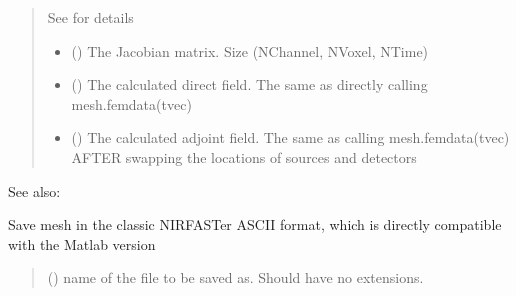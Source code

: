 \documentclass[letterpaper,10pt,english]{sphinxmanual}
\begin{document}
\begin{fulllineitems}
\begin{fulllineitems}
\begin{quote}
\begin{description}
\begin{itemize}
\sphinxAtStartPar
See {\hyperref[\detokenize{_autosummary/nirfasterff.utils.SolverOptions:nirfasterff.utils.SolverOptions}]{}} for details


\end{itemize}

\sphinxAtStartPar
\begin{itemize}
\item {} 
\sphinxAtStartPar
{} () \textendash{} The Jacobian matrix. Size (NChannel, NVoxel, NTime)

\item {} 
\sphinxAtStartPar
{} () \textendash{} The calculated direct field. The same as directly calling mesh.femdata(tvec)

\item {} 
\sphinxAtStartPar
{} () \textendash{} The calculated adjoint field. The same as calling mesh.femdata(tvec) AFTER swapping the locations of sources and detectors

\end{itemize}


\end{description}\end{quote}


\begin{sphinxseealso}{See also:}

\sphinxAtStartPar
{\hyperref[\detokenize{_autosummary/nirfasterff.inverse.jacobian_DCS:nirfasterff.inverse.jacobian_DCS}]{}}


\end{sphinxseealso}


\end{fulllineitems}


\begin{fulllineitems}
\label{\detokenize{_autosummary/nirfasterff.base.dcs_mesh.dcsmesh:nirfasterff.base.dcs_mesh.dcsmesh.save_nirfast}}
\pysigstartsignatures
\pysiglinewithargsret
{}
{}
{}
\pysigstopsignatures
\sphinxAtStartPar
Save mesh in the classic NIRFASTer ASCII format, which is directly compatible with the Matlab version
\begin{quote}\begin{description}
\sphinxAtStartPar
{} () \textendash{} name of the file to be saved as. Should have no extensions.


\end{description}
\end{quote}
\end{fulllineitems}
\end{fulllineitems}
\end{document}
